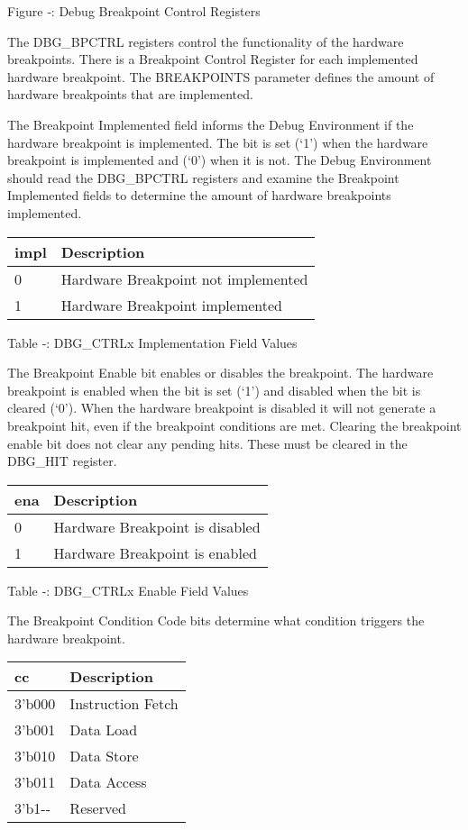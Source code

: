 \missingfigure{}

Figure ‑: Debug Breakpoint Control Registers

The DBG\_BPCTRL registers control the functionality of the hardware
breakpoints. There is a Breakpoint Control Register for each implemented
hardware breakpoint. The BREAKPOINTS parameter defines the amount of
hardware breakpoints that are implemented.

The Breakpoint Implemented field informs the Debug Environment if the
hardware breakpoint is implemented. The bit is set (`1') when the
hardware breakpoint is implemented and (`0') when it is not. The Debug
Environment should read the DBG\_BPCTRL registers and examine the
Breakpoint Implemented fields to determine the amount of hardware
breakpoints implemented.

\begin{longtable}[]{@{}ll@{}}
\toprule
impl & Description\tabularnewline
\midrule
\endhead
0 & Hardware Breakpoint not implemented\tabularnewline
1 & Hardware Breakpoint implemented\tabularnewline
\bottomrule
\end{longtable}

Table ‑: DBG\_CTRLx Implementation Field Values

The Breakpoint Enable bit enables or disables the breakpoint. The
hardware breakpoint is enabled when the bit is set (`1') and disabled
when the bit is cleared (`0'). When the hardware breakpoint is disabled
it will not generate a breakpoint hit, even if the breakpoint conditions
are met. Clearing the breakpoint enable bit does not clear any pending
hits. These must be cleared in the DBG\_HIT register.

\begin{longtable}[]{@{}ll@{}}
\toprule
ena & Description\tabularnewline
\midrule
\endhead
0 & Hardware Breakpoint is disabled\tabularnewline
1 & Hardware Breakpoint is enabled\tabularnewline
\bottomrule
\end{longtable}

Table ‑: DBG\_CTRLx Enable Field Values

The Breakpoint Condition Code bits determine what condition triggers the
hardware breakpoint.

\begin{longtable}[]{@{}ll@{}}
\toprule
cc & Description\tabularnewline
\midrule
\endhead
3'b000 & Instruction Fetch\tabularnewline
3'b001 & Data Load\tabularnewline
3'b010 & Data Store\tabularnewline
3'b011 & Data Access\tabularnewline
3'b1-\/- & Reserved\tabularnewline
\bottomrule
\end{longtable}

